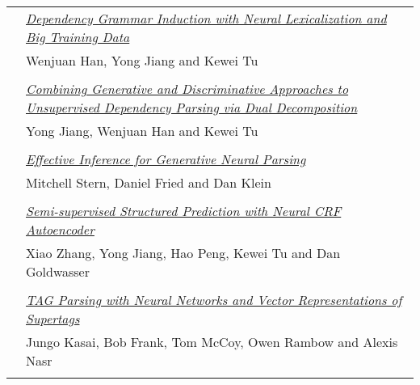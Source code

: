 \begin{tabular}{p{20mm}p{128mm}}
 & \hyperlink{page.1682}{\em Dependency Grammar Induction with Neural Lexicalization and Big Training Data}\\
         & Wenjuan Han, Yong Jiang and Kewei Tu \\
\\

 & \hyperlink{page.1688}{\em Combining Generative and Discriminative Approaches to Unsupervised Dependency Parsing via Dual Decomposition}\\
         & Yong Jiang, Wenjuan Han and Kewei Tu \\
\\

 & \hyperlink{page.1694}{\em Effective Inference for Generative Neural Parsing}\\
         & Mitchell Stern, Daniel Fried and Dan Klein \\
\\

 & \hyperlink{page.1700}{\em Semi-supervised Structured Prediction with Neural CRF Autoencoder}\\
         & Xiao Zhang, Yong Jiang, Hao Peng, Kewei Tu and Dan Goldwasser \\
\\

 & \hyperlink{page.1711}{\em TAG Parsing with Neural Networks and Vector Representations of Supertags}\\
         & Jungo Kasai, Bob Frank, Tom McCoy, Owen Rambow and Alexis Nasr \\
\\

\end{tabular}
\newpage
